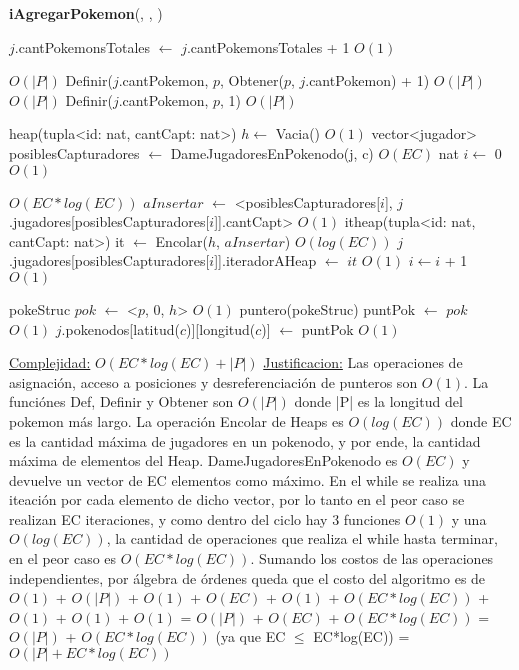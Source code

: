 \begin{Algoritmos}
\begin{algorithm}[H]
\begin{algorithmic}[1]
\end{algorithmic}
\end{algorithm}


\begin{algorithm}[H]
{\textbf{iAgregarPokemon}(, , )}
\begin{algorithmic}[1]

\State $j$.cantPokemonsTotales $\gets$ $j$.cantPokemonsTotales + 1 \Comment $O(1)$

 \Comment $O(|P|)$
	\State Definir($j$.cantPokemon, $p$, Obtener($p$, $j$.cantPokemon) + 1) \Comment $O(|P|)$
\EndIf
{}  \Comment $O(|P|)$
	\State Definir($j$.cantPokemon, $p$, 1)  \Comment $O(|P|)$
\EndIf

\State heap(tupla<id: nat, cantCapt: nat>) $h \gets$ Vacia() \Comment $O(1)$
\State vector<jugador> \hspace{0.5mm} posiblesCapturadores $\gets$ DameJugadoresEnPokenodo(j, c) \Comment $O(EC)$
\State nat $i \gets$ 0 \Comment $O(1)$

 \Comment $O(EC*log(EC))$
	\State $aInsertar$ $\gets$ <posiblesCapturadores[$i$], $j$.jugadores[posiblesCapturadores[$i$]].cantCapt> \Comment $O(1)$
	\State itheap(tupla<id: nat, cantCapt: nat>) it $\gets$ Encolar($h$, $aInsertar$) \Comment $O(log(EC))$
	\State $j$.jugadores[posiblesCapturadores[$i$]].iteradorAHeap $\gets$ $it$ \Comment $O(1)$
	\State $i \gets i$ + 1 \Comment $O(1)$
\EndWhile

\State pokeStruc $pok$ $\gets$ <$p$, 0, $h$> \Comment $O(1)$
\State puntero(pokeStruc) puntPok $\gets$ $pok$ \Comment $O(1)$
\State $j$.pokenodos[latitud($c$)][longitud($c$)] $\gets$ puntPok \Comment $O(1)$

\medskip
\State \underline{Complejidad:} $O(EC*log(EC) + |P|)$ 
\State \underline{Justificacion:} Las operaciones de asignaci\'on, acceso a posiciones y desreferenciaci\'on de punteros son $O(1)$. La funci\'ones Def, Definir y Obtener son $O(|P|)$ donde |P| es la longitud del pokemon m\'as largo. La operaci\'on Encolar de Heaps es $O(log(EC))$ donde EC es la cantidad m\'axima de jugadores en un pokenodo, y por ende, la cantidad m\'axima de elementos del Heap. DameJugadoresEnPokenodo es $O(EC)$ y devuelve un vector de EC elementos como m\'aximo. En el while se realiza una iteaci\'on por cada elemento de dicho vector, por lo tanto en el peor caso se realizan EC iteraciones, y como dentro del ciclo hay 3 funciones $O(1)$ y una $O(log(EC))$, la cantidad de operaciones que realiza el while hasta terminar, en el peor caso es $O(EC*log(EC))$. Sumando los costos de las operaciones independientes, por \'algebra de \'ordenes queda que el costo del algoritmo es de $O(1)$ + $O(|P|)$ + $O(1)$ + $O(EC)$ + $O(1)$ + $O(EC*log(EC))$ + $O(1)$ + $O(1)$ + $O(1)$ = $O(|P|)$ + $O(EC)$ + $O(EC*log(EC))$ = $O(|P|)$ + $O(EC*log(EC))$ (ya que EC $\leq$ EC*log(EC)) = $O(|P| + EC*log(EC))$


\end{algorithmic}
\end{algorithm}
\end{Algoritmos}
